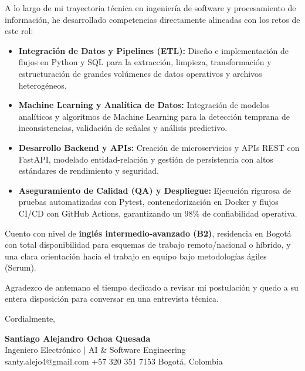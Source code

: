 \documentclass[11pt,a4paper]{article}
\begin{document}
A lo largo de mi trayectoria técnica en ingeniería de software y procesamiento de información, he desarrollado competencias directamente alineadas con los retos de este rol:

\begin{itemize}[label={\color{accentblue}\raisebox{0.2ex}{\tiny\faCircle}}, leftmargin=1.4em, itemsep=3pt, parsep=0pt, topsep=2pt]
    \item \textbf{Integración de Datos y Pipelines (ETL):} Diseño e implementación de flujos en Python y SQL para la extracción, limpieza, transformación y estructuración de grandes volúmenes de datos operativos y archivos heterogéneos.
    \item \textbf{Machine Learning y Analítica de Datos:} Integración de modelos analíticos y algoritmos de Machine Learning para la detección temprana de inconsistencias, validación de señales y análisis predictivo.
    \item \textbf{Desarrollo Backend y APIs:} Creación de microservicios y APIs REST con FastAPI, modelado entidad-relación y gestión de persistencia con altos estándares de rendimiento y seguridad.
    \item \textbf{Aseguramiento de Calidad (QA) y Despliegue:} Ejecución rigurosa de pruebas automatizadas con Pytest, contenedorización en Docker y flujos CI/CD con GitHub Actions, garantizando un 98\% de confiabilidad operativa.
\end{itemize}

Cuento con nivel de \textbf{inglés intermedio-avanzado (B2)}, residencia en Bogotá con total disponibilidad para esquemas de trabajo remoto/nacional o híbrido, y una clara orientación hacia el trabajo en equipo bajo metodologías ágiles (Scrum).

Agradezco de antemano el tiempo dedicado a revisar mi postulación y quedo a su entera disposición para conversar en una entrevista técnica.

\vspace{10pt}
\noindent Cordialmente,

\vspace{12pt}
\noindent
\textbf{\large\color{accent} Santiago Alejandro Ochoa Quesada}\\
{\small\color{subtletext} Ingeniero Electrónico | AI \& Software Engineering}\\
{\footnotesize\color{subtletext} santy.alejo4@gmail.com \;\textbar\; +57 320 351 7153 \;\textbar\; Bogotá, Colombia}
\end{document}

